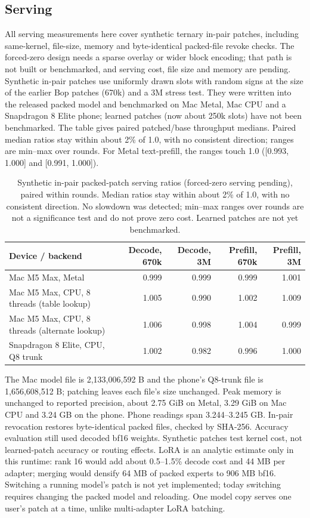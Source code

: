 \documentclass[11pt]{article}
\begin{document}
\subsection{Serving}
\label{sec:serving}
All serving measurements here cover synthetic ternary in-pair patches, including same-kernel,
file-size, memory and byte-identical packed-file revoke checks. The forced-zero design needs a
sparse overlay or wider block encoding; that path is not built or benchmarked, and serving cost,
file size and memory are pending.
Synthetic in-pair patches use uniformly drawn slots with random signs at the size of the earlier Bop
patches (670k) and a 3M stress test. They were written into the released packed model and benchmarked
on Mac Metal, Mac CPU and a Snapdragon 8 Elite phone; learned patches (now about 250k slots) have
not been benchmarked. The table gives paired patched/base throughput medians. Paired median ratios
stay within about 2\% of 1.0, with no consistent direction; ranges are min--max over rounds.
For Metal text-prefill, the ranges touch 1.0 ([0.993, 1.000] and [0.991, 1.000]).
\begin{table}[!ht]\centering\small
\begin{tabular}{lrrrr}\toprule
Device / backend & Decode, 670k & Decode, 3M & Prefill, 670k & Prefill, 3M\\\midrule
Mac M5 Max, Metal & 0.999 & 0.999 & 0.999 & 1.001\\
Mac M5 Max, CPU, 8 threads (table lookup) & 1.005 & 0.990 & 1.002 & 1.009\\
Mac M5 Max, CPU, 8 threads (alternate lookup) & 1.006 & 0.998 & 1.004 & 0.999\\
Snapdragon 8 Elite, CPU, Q8 trunk & 1.002 & 0.982 & 0.996 & 1.000\\\bottomrule
\end{tabular}
\caption{Synthetic in-pair packed-patch serving ratios (forced-zero serving pending), paired within rounds. Median ratios stay within
about 2\% of 1.0, with no consistent direction. No slowdown was detected; min--max ranges over
rounds are not a significance test and do not prove zero cost. Learned patches are not yet benchmarked.}
\end{table}
The Mac model file is 2,133,006,592 B and the phone's Q8-trunk file is 1,656,608,512 B;
patching leaves each file's size unchanged. Peak memory is unchanged to reported precision,
about 2.75 GiB on Metal, 3.29 GiB on Mac CPU and 3.24 GB on the phone. Phone readings span
3.244--3.245 GB. In-pair revocation restores byte-identical packed files, checked by SHA-256.
Accuracy evaluation still used decoded bf16 weights. Synthetic patches test kernel cost,
not learned-patch accuracy or routing effects. LoRA is an analytic estimate only in this runtime:
rank 16 would add about 0.5--1.5\% decode cost and 44 MB per adapter; merging would densify
64 MB of packed experts to 906 MB bf16. Switching a running model's patch is not yet implemented;
today switching requires changing the packed model and reloading. One model copy serves one user's
patch at a time, unlike multi-adapter LoRA batching.
\end{document}
